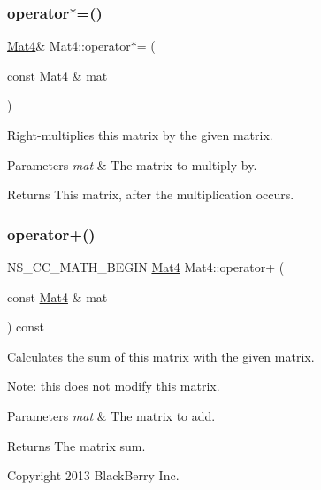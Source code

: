 \subsubsection{\texorpdfstring{operator$\ast$=()}{operator*=()}\hspace{0.1cm}{\footnotesize\ttfamily [2/2]}}
{\footnotesize\ttfamily \hyperlink{classMat4}{Mat4}\& Mat4\+::operator$\ast$= (\begin{DoxyParamCaption}\item[{const \hyperlink{classMat4}{Mat4} \&}]{mat }\end{DoxyParamCaption})\hspace{0.3cm}{\ttfamily [inline]}}

Right-\/multiplies this matrix by the given matrix.


\begin{DoxyParams}{Parameters}
{\em mat} & The matrix to multiply by. \\
\hline
\end{DoxyParams}
\begin{DoxyReturn}{Returns}
This matrix, after the multiplication occurs. 
\end{DoxyReturn}
\mbox{\label{classMat4_a090a17553d3708ee4a6e686c7b861e86}} 
\subsubsection{\texorpdfstring{operator+()}{operator+()}\hspace{0.1cm}{\footnotesize\ttfamily [1/2]}}
{\footnotesize\ttfamily N\+S\+\_\+\+C\+C\+\_\+\+M\+A\+T\+H\+\_\+\+B\+E\+G\+IN \hyperlink{classMat4}{Mat4} Mat4\+::operator+ (\begin{DoxyParamCaption}\item[{const \hyperlink{classMat4}{Mat4} \&}]{mat }\end{DoxyParamCaption}) const\hspace{0.3cm}{\ttfamily [inline]}}

Calculates the sum of this matrix with the given matrix.

Note\+: this does not modify this matrix.


\begin{DoxyParams}{Parameters}
{\em mat} & The matrix to add. \\
\hline
\end{DoxyParams}
\begin{DoxyReturn}{Returns}
The matrix sum.
\end{DoxyReturn}
Copyright 2013 Black\+Berry Inc.

